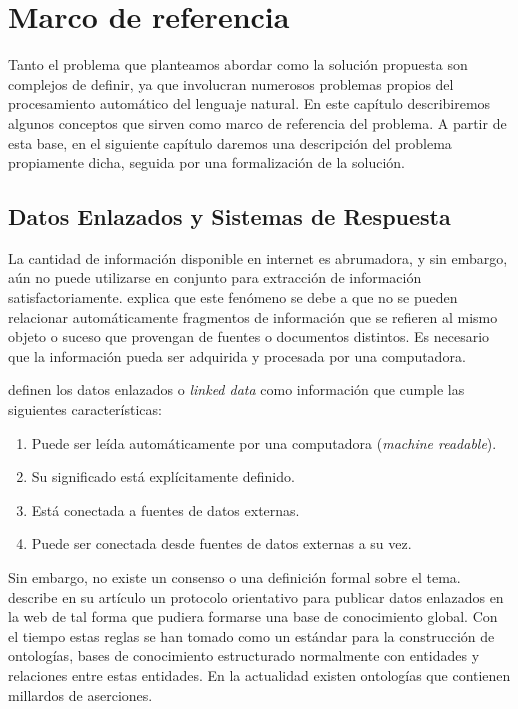 
\chapter{Marco de referencia}

Tanto el problema que planteamos abordar como la solución propuesta son complejos de definir, ya que involucran numerosos problemas propios del procesamiento automático del lenguaje natural. En este capítulo describiremos algunos conceptos que sirven como marco de referencia del problema. A partir de esta base, en el siguiente capítulo daremos una descripción del problema propiamente dicha, seguida por una formalización de la solución.

\section{Datos Enlazados y Sistemas de Respuesta}

La cantidad de información disponible en internet es abrumadora, y sin embargo, aún no puede utilizarse en conjunto para extracción de información satisfactoriamente. \citet{BernersLeeLinkedDataGuide} explica que este fenómeno se debe a que no se pueden relacionar automáticamente fragmentos de información que se refieren al mismo objeto o suceso que provengan de fuentes o documentos distintos. Es necesario que la información pueda ser adquirida y procesada por una computadora.

\citet{BizerLinkedData} definen los datos enlazados o \textit{linked data} como información que cumple las siguientes características:
\begin{enumerate}
    \item Puede ser leída automáticamente por una computadora (\textit{machine readable}).
    \item Su significado está explícitamente definido.
    \item Está conectada a fuentes de datos externas.
    \item Puede ser conectada desde fuentes de datos externas a su vez.
\end{enumerate}

Sin embargo, no existe un consenso o una definición formal sobre el tema. \citet{BernersLeeLinkedDataGuide} describe en su artículo un protocolo orientativo para publicar datos enlazados en la web de tal forma que pudiera formarse una base de conocimiento global. Con el tiempo estas reglas se han tomado como un estándar para la construcción de ontologías, bases de conocimiento estructurado normalmente con entidades y relaciones entre estas entidades. En la actualidad existen ontologías que contienen millardos de aserciones.

